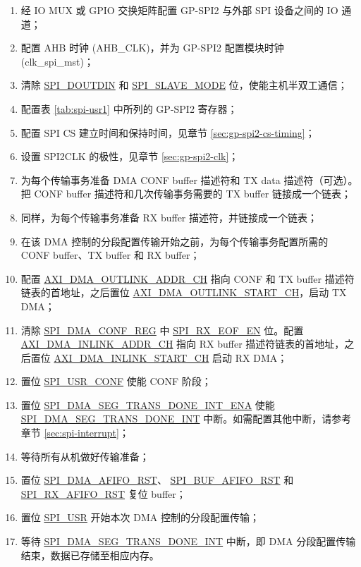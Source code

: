 \documentclass[main\_\_CN.tex]{subfiles}
\begin{document}
\begin{enumerate}
    \item 经 IO MUX 或 GPIO 交换矩阵配置 GP-SPI2 与外部 SPI 设备之间的 IO 通道； 
    \item 配置 AHB 时钟 (AHB\_CLK)，并为 GP-SPI2 配置模块时钟 (clk\_spi\_mst)；
    \item 清除 \hyperref[fielddesc:SPIDOUTDIN]{SPI\_DOUTDIN} 和 \hyperref[fielddesc:SPISLAVEMODE]{SPI\_SLAVE\_MODE} 位，使能主机半双工通信；
    \item 配置表 \ref{tab:spi-usr1} 中所列的 GP-SPI2 寄存器；
    \item 配置 SPI CS 建立时间和保持时间，见章节 \ref{sec:gp-spi2-cs-timing}；
    \item 设置 SPI2CLK 的极性，见章节 \ref{sec:gp-spi2-clk}； 
   \item 为每个传输事务准备 DMA CONF buffer 描述符和 TX data 描述符（可选）。把 CONF buffer 描述符和几次传输事务需要的 TX buffer 链接成一个链表；
   \item 同样，为每个传输事务准备 RX buffer 描述符，并链接成一个链表； 
   \item 在该 DMA 控制的分段配置传输开始之前，为每个传输事务配置所需的 CONF buffer、TX buffer 和 RX buffer；
   \item 配置 \hyperref[fielddesc:AXIDMAOUTLINKADDRCHN]{AXI\_DMA\_OUTLINK\_ADDR\_CH} 指向 CONF 和 TX buffer 描述符链表的首地址，之后置位 \hyperref[fielddesc:AXIDMAOUTLINKSTARTCHN]{AXI\_DMA\_OUTLINK\_START\_CH}，启动 TX DMA；
   \item 清除 \hyperref[regdesc:SPIDMACONFREG]{SPI\_DMA\_CONF\_REG} 中 \hyperref[fielddesc:SPIRXEOFEN]{SPI\_RX\_EOF\_EN} 位。配置 \hyperref[fielddesc:AXIDMAINLINKADDRCHN]{AXI\_DMA\_INLINK\_ADDR\_CH} 指向 RX buffer 描述符链表的首地址，之后置位 \hyperref[fielddesc:AXIDMAINLINKSTARTCHN]{AXI\_DMA\_INLINK\_START\_CH} 启动 RX DMA；   
   \item 置位 \hyperref[fielddesc:SPIUSRCONF]{SPI\_USR\_CONF} 使能 CONF 阶段；
   \item 置位 \hyperref[fielddesc:SPIDMASEGTRANSDONEINTENA]{SPI\_DMA\_SEG\_TRANS\_DONE\_INT\_ENA} 使能 \hyperref[int:SPIDMASEGTRANSDONEINT]{SPI\_DMA\_SEG\_TRANS\_DONE\_INT} 中断。如需配置其他中断，请参考章节 \ref{sec:spi-interrupt}； 
   \item 等待所有从机做好传输准备；
    \item 置位 \hyperref[fielddesc:SPIDMAAFIFORST]{SPI\_DMA\_AFIFO\_RST}、 \hyperref[fielddesc:SPIBUFAFIFORST]{SPI\_BUF\_AFIFO\_RST} 和 \hyperref[fielddesc:SPIRXAFIFORST]{SPI\_RX\_AFIFO\_RST} 复位 buffer；
   \item 置位 \hyperref[fielddesc:SPIUSR]{SPI\_USR} 开始本次 DMA 控制的分段配置传输；
   \item 等待 \hyperref[int:SPIDMASEGTRANSDONEINT]{SPI\_DMA\_SEG\_TRANS\_DONE\_INT} 中断，即 DMA 分段配置传输结束，数据已存储至相应内存。
\end{enumerate}
\end{document}
